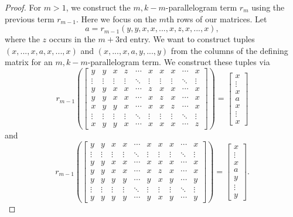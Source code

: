 \begin{proof}
For $m > 1$, we construct the $m,k-m$-parallelogram term $r_m$ using the previous term $r_{m-1}$. Here we focus on the $m$th rows of our matrices. Let
\[
a = r_{m-1}(y,y,x,x,...,x,z,x,...,x),
\]
where the $z$ occurs in the $m+3$rd entry. We want to construct tuples $(x,...,x,a,x,...,x)$ and $(x,...,x,a,y,...,y)$ from the columns of the defining matrix for an $m,k-m$-parallelogram term. We construct these tuples via
\[
r_{m-1}\left(\begin{bmatrix} y & y & x & z & \cdots & x & x & x & \cdots & x\\ \vdots & \vdots & \vdots & \vdots & \ddots & \vdots & \vdots & \vdots & \ddots & \vdots \\ y & y & x & x & \cdots & z & x & x & \cdots & x\\ y & y & x & x & \cdots & x & z & x & \cdots & x\\ x & y & y & x & \cdots & x & x & z & \cdots & x\\ \vdots & \vdots & \vdots & \vdots & \ddots & \vdots & \vdots & \vdots & \ddots & \vdots \\ x & y & y & x & \cdots & x & x & x & \cdots & z\end{bmatrix}\right) = \begin{bmatrix} x\\ \vdots \\ x\\ a\\ x\\ \vdots \\ x\end{bmatrix}
\]
and
\[
r_{m-1}\left(\begin{bmatrix} y & y & x & x & \cdots & x & x & x & \cdots & x\\ \vdots & \vdots & \vdots & \vdots & \ddots & \vdots & \vdots & \vdots & \ddots & \vdots \\ y & y & x & x & \cdots & x & x & x & \cdots & x\\ y & y & x & x & \cdots & x & z & x & \cdots & x\\ y & y & y & y & \cdots & y & x & y & \cdots & y\\ \vdots & \vdots & \vdots & \vdots & \ddots & \vdots & \vdots & \vdots & \ddots & \vdots \\ y & y & y & y & \cdots & y & x & y & \cdots & y\end{bmatrix}\right) = \begin{bmatrix} x\\ \vdots \\ x\\ a\\ y\\ \vdots \\ y\end{bmatrix}.
\]
\end{proof}
